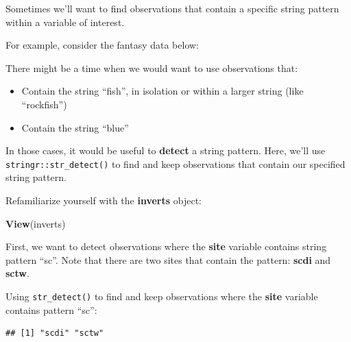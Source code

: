 \documentclass[]{book}
\newenvironment{Shaded}{\begin{snugshade}}{\end{snugshade}}
\newcommand{\CommentTok}[1]{\textcolor[rgb]{0.56,0.35,0.01}{\textit{#1}}}
\newcommand{\DataTypeTok}[1]{\textcolor[rgb]{0.13,0.29,0.53}{#1}}
\newcommand{\KeywordTok}[1]{\textcolor[rgb]{0.13,0.29,0.53}{\textbf{#1}}}
\newcommand{\NormalTok}[1]{#1}
\newcommand{\OperatorTok}[1]{\textcolor[rgb]{0.81,0.36,0.00}{\textbf{#1}}}
\newcommand{\StringTok}[1]{\textcolor[rgb]{0.31,0.60,0.02}{#1}}
\providecommand{\tightlist}{%
  \setlength{\itemsep}{0pt}\setlength{\parskip}{0pt}}
\begin{document}
Sometimes we'll want to find observations that contain a specific string pattern within a variable of interest.

For example, consider the fantasy data below:

There might be a time when we would want to use observations that:

\begin{itemize}
\tightlist
\item
  Contain the string ``fish'', in isolation or within a larger string (like ``rockfish'')
\item
  Contain the string ``blue''
\end{itemize}

In those cases, it would be useful to \textbf{detect} a string pattern. Here, we'll use \texttt{stringr::str\_detect()} to find and keep observations that contain our specified string pattern.

Refamiliarize yourself with the \textbf{inverts} object:

\begin{Shaded}
\begin{Highlighting}[]
\KeywordTok{View}\NormalTok{(inverts)}
\end{Highlighting}
\end{Shaded}

First, we want to detect observations where the \textbf{site} variable contains string pattern ``sc''. Note that there are two sites that contain the pattern: \textbf{scdi} and \textbf{sctw}.

Using \texttt{str\_detect()} to find and keep observations where the \textbf{site} variable contains pattern ``sc'':

\begin{Shaded}
\end{Shaded}

\begin{verbatim}
## [1] "scdi" "sctw"
\end{verbatim}
\end{document}
